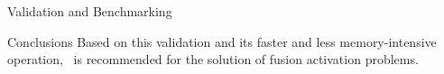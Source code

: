 \begin{chapter}{Validation and Benchmarking\label{chap:valid}}
\begin{section}{Conclusions}
    Based on this validation and its faster and less memory-intensive
    operation, \ALARA\ is recommended for the solution of fusion
    activation problems.
    
  \end{section}

\end{chapter}

